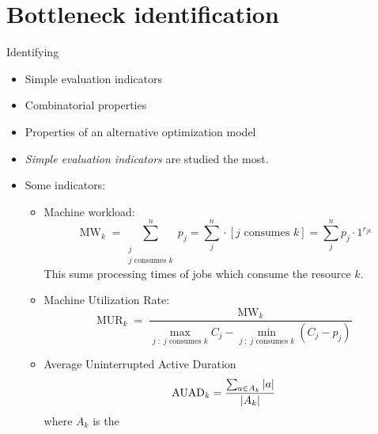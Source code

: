 \section*{Bottleneck identification}

Identifying 

\begin{itemize}
    \item Simple evaluation indicators
    \item Combinatorial properties
    \item Properties of an alternative optimization model
\end{itemize}

\begin{itemize}
    \item \emph{Simple evaluation indicators} are studied the most.

    \item Some indicators:
    \begin{itemize}
        \item Machine workload:
            $$
            \operatorname{MW}_k = \sum_{\substack{j\\ \text{$j$ consumes $k$}}}^n p_j = \sum_j^n \cdot \left[ \text{$j$ consumes $k$} \right]= \sum_j^n p_j \cdot 1^{r_{jk}}
            $$ 
            This sums processing times of jobs which consume the resource $k$.

        \item Machine Utilization Rate:
            $$
            \operatorname{MUR}_k = \frac{\operatorname{MW}_k}{\max_{j \;:\; \text{$j$ consumes $k$}} C_j - \min_{j \;:\; \text{$j$ consumes $k$}} (C_j - p_j)}
            $$

        \item Average Uninterrupted Active Duration
            $$
            \operatorname{AUAD}_k = \frac{\sum_{a \in A_k} \left|{a}\right|}{\left|{A_k}\right|}
            $$
            where $A_k$ is the 
    \end{itemize}
\end{itemize}
